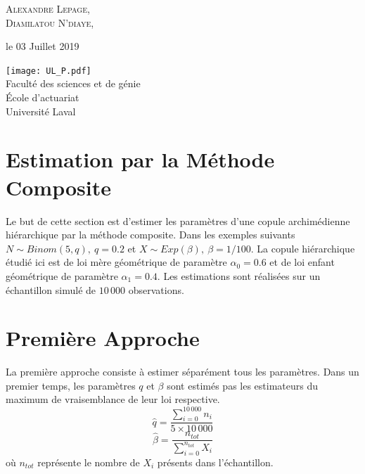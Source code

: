 \documentclass[11pt]{article}
\begin{document}
\begin{titlepage}
		\vspace{0.5\baselineskip} %
		
		{\scshape\Large Alexandre Lepage, \\
			Diamilatou N'diaye, \\} %
		
		\vspace*{5\baselineskip}
		
		le 03 Juillet 2019
		
		\vspace{0.5\baselineskip} %
		
		\vfill %
		
		
		\texttt{[image: UL\_P.pdf]}\\
		
		Faculté des sciences et de génie\\
		École d'actuariat\\
		Université Laval\\     
	\end{titlepage}
	

\section{Estimation par la Méthode Composite}

	Le but de cette section est d'estimer les paramètres d'une copule archimédienne hiérarchique par la méthode composite. Dans les exemples suivants $N \sim Binom(5,q), \ q=0.2$ et $X \sim Exp(\beta) , \ \beta=1/100$. La copule hiérarchique étudié ici est de loi mère géométrique de paramètre $\alpha_{0}=0.6$ et de loi enfant géométrique de paramètre $\alpha_{1}=0.4$. Les estimations sont réalisées sur un échantillon simulé de $10\,000$ observations.

\section{Première Approche}
	
	La première approche consiste à estimer séparément tous les paramètres. Dans un premier temps, les paramètres $q$ et $\beta$ sont estimés pas les estimateurs du maximum de vraisemblance de leur loi respective. 
	\[ \hat{q} = \frac{\sum^{10\,000}_{i=0} n_{i}}{5\times 10\,000} \]
	\[ \hat{\beta} = \frac{n_{tot}}{\sum^{n_{tot}}_{i=0} X_{i}} \]
	où $n_{tot}$ représente le nombre de $X_{i}$ présents dans l'échantillon.
	
\end{document}
